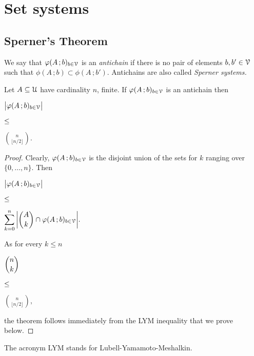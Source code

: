 \documentclass[scombinatorics.tex]{subfiles}
\begin{document}
\chapter{Set systems}
\label{sperner}



\def\medrel#1{\parbox[t]{6ex}{$\displaystyle\hfil #1$}}
\def\ceq#1#2#3{\parbox[t]{40ex}{$\displaystyle #1$}\medrel{#2}{$\displaystyle #3$}}

\def\separatore{\hfil o \rule[0.5ex]{4ex}{0.1ex} o \rule[0.5ex]{4ex}{0.1ex} o}


\section{Sperner's Theorem}\label{sperner}

We say that $\varphi(A\,;b)_{b\in\EuScript V}$ is an \emph{antichain\/} if there is no pair of elements $b,b'\in\EuScript V$ such that $\phi(A\,;b)\subset\phi(A\,;b')$.
Antichains are also called \emph{Sperner systems.}

\def\ceq#1#2#3{\parbox[t]{36ex}{$\displaystyle #1$}\medrel{#2}{$\displaystyle #3$}}

\begin{void_thm}
   Let $A\subseteq\EuScript U$ have cardinality $n$, finite.
   If $\varphi(A\,;b)_{b\in\EuScript V}$ is an antichain then
   
   \ceq{\hfill\big|\phi(A\,;b)_{b\in\V}\big|}{\le}{{n\choose\lfloor n/2\rfloor}.}
\end{void_thm}
\smallskip
\begin{proof}
   Clearly, $\varphi(A\,;b)_{b\in\EuScript V}$ is the disjoint union of the sets  for $k$ ranging over $\{0,\dots,n\}$.
   Then 

   \ceq{\hfill\big|\phi(A\,;b)_{b\in\V}\big|}{\le}{\sum^n_{k=0}\bigg|{A\choose k}\cap\phi(A\,;b)_{b\in\V}\bigg|.}

   As for every $k\le n$
   
   \ceq{\hfill{n\choose k}}{\le}{{n\choose\lfloor n/2\rfloor},}

   the theorem follows immediately from the LYM inequality that we prove below.
\end{proof}

The acronym LYM stands for Lubell-Yamamoto-Meshalkin.
\end{document}
